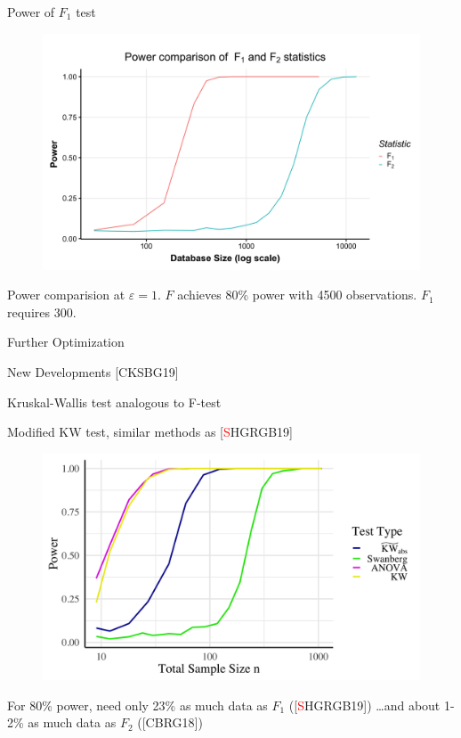 \documentclass{beamer}
\begin{document}
\begin{frame}{Power of $F_1$ test}
  \begin{figure}
  \includegraphics[scale=0.1]{images/f1-vs-f2}
  \end{figure}
  Power comparision at $\varepsilon=1$.  $F$ achieves 80\% power with 4500 observations.  $F_1$ requires 300.
\end{frame}


\begin{frame}{Further Optimization}
\end{frame}

\begin{frame}{New Developments [CKSBG19]}

Kruskal-Wallis test analogous to F-test \pause
\bigskip 

Modified KW test, similar methods as [\textcolor{red}{S}HGRGB19] \pause

\begin{figure}
  \includegraphics[scale=0.075]{images/anova_comp}
  \end{figure}
  
  For 80\% power, need only 23\% as much data as $F_1$ ([\textcolor{red}{S}HGRGB19]) \ldots \pause and about 1-2\% as much data as $F_2$ ([CBRG18])
\end{frame}
\end{document}

